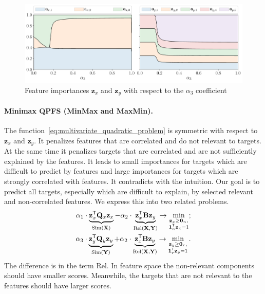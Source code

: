 \documentclass[12pt,twoside]{article}
\theoremstyle{definition}
\newcommand{\bz}{\mathbf{z}}
\newcommand{\bY}{\mathbf{Y}}
\newcommand{\bX}{\mathbf{X}}
\newcommand{\bQ}{\mathbf{Q}}
\newcommand{\T}{\mathsf{T}}
\newcommand{\bOne}{\boldsymbol{1}}
\newcommand{\bZero}{\boldsymbol{0}}
\begin{document}
\begin{figure}
	\centering
	\includegraphics[width=\linewidth]{figs/features_vs_alpha.pdf}
	\caption{Feature importances $\bz_x$ and $\bz_y$ with respect to the $\alpha_3$ coefficient}
	\label{fig:features_vs_alpha}
\end{figure}

\paragraph{Minimax QPFS (MinMax and MaxMin).}
The function~\eqref{eq:multivariate_quadratic_problem} is symmetric with respect to~$\bz_x$ and $\bz_y$.
It penalizes features that are correlated and do not relevant to targets.
At the same time it penalizes targets that are correlated and are not sufficiently explained by the features.
It leads to small importances for targets which are difficult to predict by features and large importances for targets which are strongly correlated with features.
It contradicts with the intuition.
Our goal is to predict all targets, especially which are difficult to explain, by selected relevant and non-correlated features. We express this into two related problems.
\begin{align}
	\alpha_1 \cdot \underbrace{\bz_x^{\T} \bQ_x \bz_x}_{\text{Sim}(\bX)} - \alpha_2 \cdot \underbrace{\vphantom{()} \bz_x^{\T}\mathbf{B} \bz_y}_{\text{Rel}(\bX, \bY)} \rightarrow \min_{\substack{\bz_x \geq \bZero_n, \\ \bOne_n^{\T}\bz_x=1}};
	\label{eq:x_qpfs}\\
	\alpha_3 \cdot \underbrace{\bz_y^{\T} \bQ_y \bz_y}_{\text{Sim}(\bY)} + \alpha_2 \cdot \underbrace{\vphantom{()} \bz_x^{\T} \mathbf{B} \bz_y}_{\text{Rel}(\bX, \bY)} \rightarrow \min_{\substack{\bz_y \geq \bZero_r,  \\ \bOne_r^{\T}\bz_y=1}}.
	\label{eq:y_qpfs}
\end{align}
The difference is in the term Rel.
In feature space the non-relevant components should have smaller scores.
Meanwhile, the targets that are not relevant to the features should have larger scores.
\end{document}
